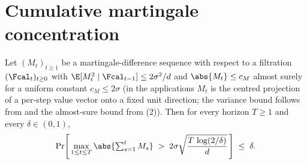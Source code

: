 \section{Cumulative martingale concentration}
\label{sec:azuma}

\begin{lemma}
\label{lem:azuma}
Let $(M_t)_{t\ge1}$ be a martingale-difference sequence with respect to a
filtration $(\Fcal_t)_{t\ge0}$ with
$\E[M_t^2\mid\Fcal_{t-1}]\le 2\sigma^2/d$ and $\abs{M_t}\le c_M$ almost
surely for a uniform constant $c_M\le 2\sigma$ (in the applications $M_t$
is the centred projection of a per-step value vector onto a fixed unit
direction; the variance bound follows from  and
the almost-sure bound from (2)). Then for
every horizon $T\ge1$ and every $\delta\in(0,1)$,
\begin{align}\label{eq:azuma_tail}
   \Pr\!\left[\,
      \max_{1\le t\le T} \abs{\textstyle\sum_{s=1}^{t} M_s}
      \;>\;
      2\sigma\sqrt{\frac{T\,\log(2/\delta)}{d}}
   \,\right]
   \;\le\; \delta.
\end{align}
\end{lemma}

